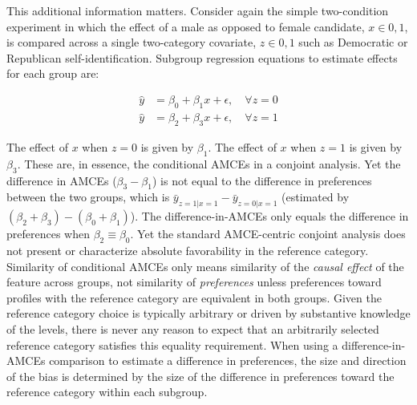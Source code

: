 \documentclass[a4paper,12pt]{article}\usepackage[]{graphicx}\usepackage[]{color}
\begin{document}
This additional information matters. Consider again the simple two-condition experiment in which the effect of a male as opposed to female candidate, $x \in {0,1}$, is compared across a single two-category covariate, $z \in {0,1}$ such as Democratic or Republican self-identification. Subgroup regression equations to estimate effects for each group are:

\begin{align*}
\hat{y} &= \beta_0 + \beta_1 x + \epsilon, \quad \forall z = 0 \\
\hat{y} &= \beta_2 + \beta_3 x + \epsilon, \quad \forall z = 1
\end{align*}

\noindent The effect of $x$ when $z=0$ is given by $\beta_1$. The effect of $x$ when $z=1$ is given by $\beta_3$. These are, in essence, the conditional AMCEs in a conjoint analysis. Yet the difference in AMCEs ($\beta_3 - \beta_1$) is not equal to the difference in preferences between the two groups, which is $\bar{y}_{z=1|x=1} - \bar{y}_{z=0|x=1}$ (estimated by $(\beta_2 + \beta_3) - (\beta_0 + \beta_1)$). The difference-in-AMCEs only equals the difference in preferences when $\beta_2 \equiv \beta_0$. Yet the standard AMCE-centric conjoint analysis does not present or characterize absolute favorability in the reference category. Similarity of conditional AMCEs only means similarity of the \textit{causal effect} of the feature across groups, not similarity of \textit{preferences} unless preferences toward profiles with the reference category are equivalent in both groups. Given the reference category choice is typically arbitrary or driven by substantive knowledge of the levels, there is never any reason to expect that an arbitrarily selected reference category satisfies this equality requirement. When using a difference-in-AMCEs comparison to estimate a difference in preferences, the size and direction of the bias is determined by the size of the difference in preferences toward the reference category within each subgroup.
\end{document}

